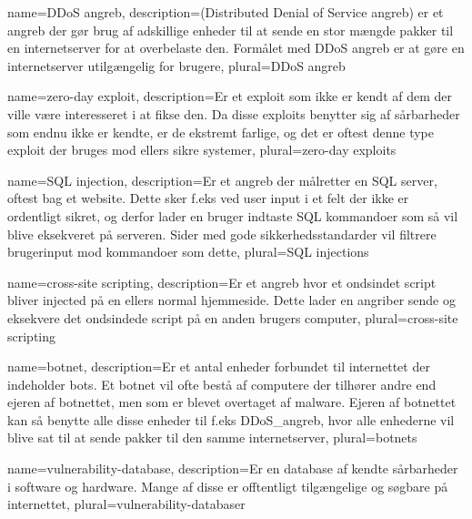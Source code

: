 \makeglossaries

{
    name={DDoS angreb},
    description={(Distributed Denial of Service angreb) er et angreb der gør brug af adskillige enheder til at sende en stor mængde pakker til en internetserver for at overbelaste den. Formålet med DDoS angreb er at gøre en internetserver utilgængelig for brugere},
    plural={DDoS angreb}
}

{
    name={zero-day exploit},
    description={Er et exploit som ikke er kendt af dem der ville være interesseret i at fikse den. Da disse exploits benytter sig af sårbarheder som endnu ikke er kendte, er de ekstremt farlige, og det er oftest denne type exploit der bruges mod ellers sikre systemer},
    plural={zero-day exploits}
}

{
    name={SQL injection},
    description={Er et angreb der målretter en SQL server, oftest bag et website. Dette sker f.eks ved user input i et felt der ikke er ordentligt sikret, og derfor lader en bruger indtaste SQL kommandoer som så vil blive eksekveret på serveren. Sider med gode sikkerhedsstandarder vil filtrere brugerinput mod kommandoer som dette},
    plural={SQL injections}
}

{
    name={cross-site scripting},
    description={Er et angreb hvor et ondsindet script bliver injected på en ellers normal hjemmeside. Dette lader en angriber sende og eksekvere det ondsindede script på en anden brugers computer},
    plural={cross-site scripting}
}

{
    name={botnet},
    description={Er et antal enheder forbundet til internettet der indeholder bots. Et botnet vil ofte bestå af computere der tilhører andre end ejeren af botnettet, men som er blevet overtaget af malware. Ejeren af botnettet kan så benytte alle disse enheder til f.eks \Gls{DDoS_angreb}, hvor alle enhederne vil blive sat til at sende pakker til den samme internetserver}, 
    plural={botnets}
}

{
    name={vulnerability-database},
    description={Er en database af kendte sårbarheder i software og hardware. Mange af disse er offtentligt tilgængelige og søgbare på internettet}, 
    plural={vulnerability-databaser}
}